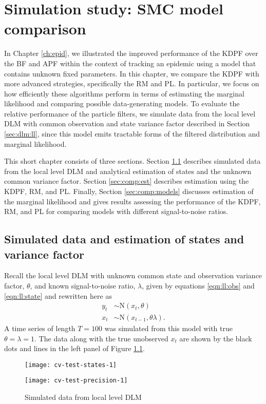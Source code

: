 \chapter{Simulation study: SMC model comparison \label{ch:comp}}

In Chapter \ref{ch:epid}, we illustrated the improved performance of the KDPF over the BF and APF within the context of tracking an epidemic using a model that contains unknown fixed parameters. In this chapter, we compare the KDPF with more advanced strategies, specifically the RM and PL. In particular, we focus on how efficiently these algorithms perform in terms of estimating the marginal likelihood and comparing possible data-generating models. To evaluate the relative performance of the particle filters, we simulate data from the local level DLM with common observation and state variance factor described in Section \ref{sec:dlm:ll}, since this model emits tractable forms of the filtered distribution and marginal likelihood.

This short chapter consists of three sections. Section \ref{sec:comp:data} describes simulated data from the local level DLM and analytical estimation of states and the unknown common variance factor. Section \ref{sec:comp:est} describes estimation using the KDPF, RM, and PL. Finally, Section \ref{sec:comp:models} discusses estimation of the marginal likelihood and gives results assessing the performance of the KDPF, RM, and PL for comparing models with different signal-to-noise ratios.

\section{Simulated data and estimation of states and variance factor} \label{sec:comp:data}

Recall the local level DLM with unknown common state and observation variance factor, $\theta$, and known signal-to-noise ratio, $\lambda$, given by equations \eqref{eqn:ll:obs} and \eqref{eqn:ll:state} and rewritten here as
\begin{align*}
y_t &\sim \mbox{N}(x_t, \theta) \\
x_t &\sim \mbox{N}(x_{t-1}, \theta\lambda).
\end{align*}
A time series of length $T = 100$ was simulated from this model with true $\theta = \lambda = 1$. The data along with the true unobserved $x_t$ are shown by the black dots and lines in the left panel of Figure \ref{fig:comp:data}.
 
\begin{figure}[ht]
\ssp
\centering
\caption{Simulated data from local level DLM} \label{fig:comp:data}
\begin{minipage}{0.45\linewidth}
\texttt{[image: cv-test-states-1]}
\end{minipage}
\begin{minipage}{0.45\linewidth}
\texttt{[image: cv-test-precision-1]}
\end{minipage}
\end{figure}
 
